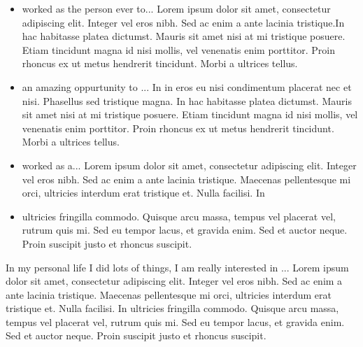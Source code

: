 \documentclass[10pt,a4paper,ragged2e,withhyper,normalphoto]{config/altacv}
\begin{document}
\begin{paracol}{2}
\begin{itemize}
\item worked as the  person ever to... Lorem ipsum dolor sit amet, consectetur adipiscing elit. Integer vel eros nibh. Sed ac enim a ante lacinia tristique.In hac habitasse platea dictumst. Mauris sit amet nisi at mi tristique posuere. Etiam tincidunt magna id nisi mollis, vel venenatis enim porttitor. Proin rhoncus ex ut metus hendrerit tincidunt. Morbi a ultrices tellus. 
\end{itemize}
\begin{itemize}
\item an amazing oppurtunity to ... In in eros eu nisi condimentum placerat nec et nisi. Phasellus sed tristique magna. In hac habitasse platea dictumst. Mauris sit amet nisi at mi tristique posuere. Etiam tincidunt magna id nisi mollis, vel venenatis enim porttitor. Proin rhoncus ex ut metus hendrerit tincidunt. Morbi a ultrices tellus. 
\end{itemize}

\begin{itemize}
\item worked as a... Lorem ipsum dolor sit amet, consectetur adipiscing elit. Integer vel eros nibh. Sed ac enim a ante lacinia tristique. Maecenas pellentesque mi orci, ultricies interdum erat tristique et. Nulla facilisi. In 
\item ultricies fringilla commodo. Quisque arcu massa, tempus vel placerat vel, rutrum quis mi. Sed eu tempor lacus, et gravida enim. Sed et auctor neque. Proin suscipit justo et rhoncus suscipit.
\end{itemize}

\switchcolumn %


\color{body}
In my personal life I did lots of things, I am really interested in ...  Lorem ipsum dolor sit amet, consectetur adipiscing elit. Integer vel eros nibh. Sed ac enim a ante lacinia tristique. Maecenas pellentesque mi orci, ultricies interdum erat tristique et. Nulla facilisi. In ultricies fringilla commodo. Quisque arcu massa, tempus vel placerat vel, rutrum quis mi. Sed eu tempor lacus, et gravida enim. Sed et auctor neque. Proin suscipit justo et rhoncus suscipit.


\end{paracol}
\end{document}
